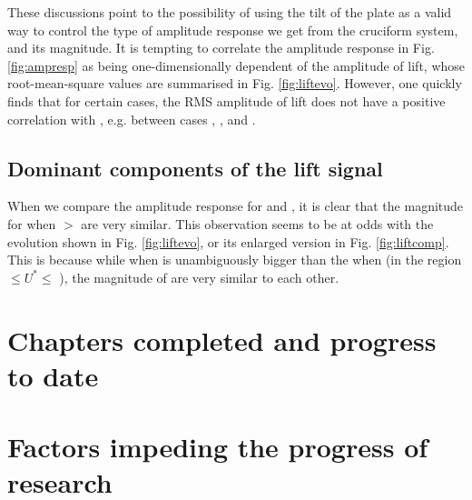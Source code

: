 \documentclass[a4paper]{article}
\begin{document}
These discussions point to the possibility of using the tilt of the plate as a valid way to control the type of amplitude response we get from the cruciform system, and its magnitude. It is tempting to correlate the amplitude response in Fig. \ref{fig:ampresp} as being one-dimensionally dependent of the amplitude of lift, whose root-mean-square values are summarised in Fig. \ref{fig:liftevo}. However, one quickly finds that for certain cases, the RMS amplitude of lift does not have a positive correlation with \yrms{}, e.g. between cases \ptlt{} \es{} \rtw{}, \rth{}, and \rfo{}.

\subsection{Dominant components of the lift signal}\label{dominantComponents}

When we compare the amplitude response for \ptlt{} \es{} \rtw{} and \rth{}, it is clear that the magnitude for \yrms{} when \ured{} $>$ \urfi{} are very similar. This observation seems to be at odds with the \flrms{} evolution shown in Fig. \ref{fig:liftevo}, or its enlarged version in Fig. \ref{fig:liftcomp}. This is because while \flrms{} when \ptlt{} \es{} \rth{} is unambiguously bigger than the \flrms{} when \ptlt{} \es{} \rtw{} (in the region \urfi{} $\leq U^{*} \leq$ \urtt{}), the magnitude of \yrms{} are very similar to each other.
\newpage

\section{Chapters completed and progress to date}

\section{Factors impeding the progress of research}

\printbibliography
\end{document}
